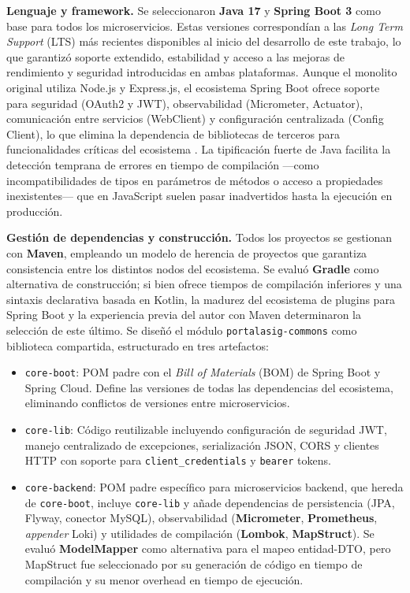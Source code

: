 \textbf{Lenguaje y framework.} Se seleccionaron \textbf{Java 17} y \textbf{Spring Boot
3} como base para todos los microservicios. Estas versiones correspondían a las
\textit{Long Term Support} (LTS) más recientes disponibles al inicio del desarrollo de
este trabajo, lo que garantizó soporte extendido, estabilidad y acceso a las mejoras de
rendimiento y seguridad introducidas en ambas plataformas. Aunque el monolito original
utiliza Node.js y Express.js, el ecosistema Spring Boot ofrece soporte para seguridad (OAuth2 y JWT), observabilidad
(Micrometer, Actuator), comunicación entre servicios (WebClient) y configuración
centralizada (Config Client), lo que elimina la dependencia de bibliotecas de terceros
para funcionalidades críticas del ecosistema \cite{newman2015building}. La tipificación fuerte de Java
facilita la detección temprana de errores en tiempo de compilación —como incompatibilidades
de tipos en parámetros de métodos o acceso a propiedades inexistentes— que en JavaScript
suelen pasar inadvertidos hasta la ejecución en producción.

\textbf{Gestión de dependencias y construcción.} Todos los proyectos se gestionan con
\textbf{Maven}, empleando un modelo de herencia de proyectos que garantiza consistencia
entre los distintos nodos del ecosistema. Se evaluó \textbf{Gradle} como alternativa
de construcción; si bien ofrece tiempos de compilación inferiores y una sintaxis
declarativa basada en Kotlin, la madurez del ecosistema de plugins para Spring Boot
y la experiencia previa del autor con Maven determinaron la selección de este último.
Se diseñó el módulo \texttt{portalasig-commons} como biblioteca compartida, estructurado
en tres artefactos:

\begin{itemize}
    \item \texttt{core-boot}: POM padre con el \textit{Bill of Materials} (BOM)
    de Spring Boot y Spring Cloud. Define las versiones de todas las dependencias del
    ecosistema, eliminando conflictos de versiones entre microservicios.
    \item \texttt{core-lib}: Código reutilizable incluyendo configuración de seguridad
    JWT, manejo centralizado de excepciones, serialización JSON, CORS y clientes HTTP
    con soporte para \texttt{client\_credentials} y \texttt{bearer} tokens.
    \item \texttt{core-backend}: POM padre específico para microservicios backend, que
    hereda de \texttt{core-boot}, incluye \texttt{core-lib} y añade dependencias de
    persistencia (JPA, Flyway, conector MySQL), observabilidad (\textbf{Micrometer}, \textbf{Prometheus},
    \textit{appender} Loki) y utilidades de compilación (\textbf{Lombok}, \textbf{MapStruct}).
    Se evaluó \textbf{ModelMapper} como alternativa para el mapeo entidad-DTO,
    pero MapStruct fue seleccionado por su generación de código en tiempo de
    compilación y su menor overhead en tiempo de ejecución.
\end{itemize}

